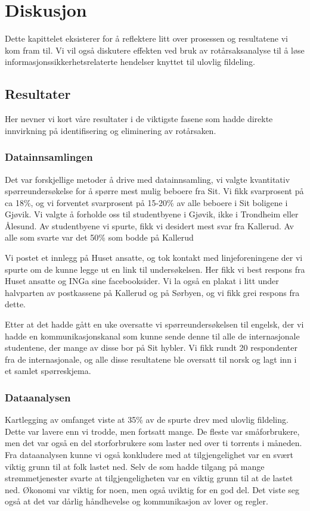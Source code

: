 \chapter{Diskusjon}
Dette kapittelet eksisterer for å reflektere litt over prosessen og resultatene vi kom fram til. Vi vil også diskutere effekten ved bruk av rotårsaksanalyse til å løse informasjonssikkerhetsrelaterte hendelser knyttet til ulovlig fildeling. 

\section{Resultater}
Her nevner vi kort våre resultater i de viktigste fasene som hadde direkte innvirkning på identifisering og eliminering av rotårsaken. 

\subsection{Datainnsamlingen}
Det var forskjellige metoder å drive med datainnsamling, vi valgte kvantitativ spørreundersøkelse for å spørre mest mulig beboere fra Sit. Vi fikk svarprosent på ca 18\%, og vi forventet svarprosent på 15-20\% av alle beboere i Sit boligene i Gjøvik. Vi valgte å forholde oss til studentbyene i Gjøvik, ikke i Trondheim eller Ålesund. Av studentbyene vi spurte, fikk vi desidert mest svar fra Kallerud. Av alle som svarte var det 50\% som bodde på Kallerud

Vi postet et innlegg på Huset ansatte, og tok kontakt med linjeforeningene der vi spurte om de kunne legge ut en link til undersøkelsen. Her fikk vi best respons fra Huset ansatte og INGa sine facebooksider. Vi la også en plakat i litt under halvparten av postkassene på Kallerud og på Sørbyen, og vi fikk grei respons fra dette.

Etter at det hadde gått en uke oversatte vi spørreundersøkelsen til engelsk, der vi hadde en kommunikasjonskanal som kunne sende denne til alle de internasjonale studentene, der mange av disse bor på Sit hybler. Vi fikk rundt 20 respondenter fra de internasjonale, og alle disse resultatene ble oversatt til norsk og lagt inn i et samlet spørreskjema.


\subsection{Dataanalysen}
Kartlegging av omfanget viste at 35\% av de spurte drev med ulovlig fildeling. Dette var lavere enn vi trodde, men fortsatt mange. De fleste var småforbrukere, men det var også en del storforbrukere som laster ned over ti torrents i måneden. Fra dataanalysen kunne vi også konkludere med at tilgjengelighet var en svært viktig grunn til at folk lastet ned. Selv de som hadde tilgang på mange strømmetjenester svarte at tilgjengeligheten var en viktig grunn til at de lastet ned. Økonomi var viktig for noen, men også uviktig for en god del. Det viste seg også at det var dårlig håndhevelse og kommunikasjon av lover og regler. 

